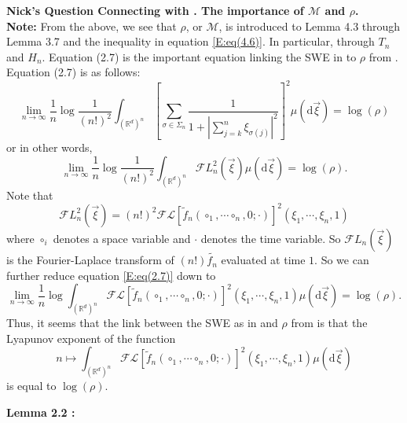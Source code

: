 \documentclass[a4paper,11pt]{article}
\numberwithin{equation}{section}
\theoremstyle{plain}
\theoremstyle{definition}
\newcommand{\ud}{\ensuremath{\mathrm{d} }}
\newcommand{\R}{\mathbb{R}}
\newcounter{NQ}
\newenvironment{NickQuestion}[1][] %
{\refstepcounter{NQ}
	\begin{mdframed}[backgroundcolor=lightgray]\textbf{Nick's Question \theNQ \: #1~~}~~~\noindent}%
	{\end{mdframed}}
\numberwithin{NQ}{section}
\numberwithin{LQ}{section}
\numberwithin{ZQ}{section}
\begin{document}
\begin{NickQuestion}[Connecting \cite{BCC21} with \cite{BCR09}. The importance of $\mathcal{M}$ and $\rho$.]
\textbf{Note:} From the above, we see that $\rho$, or $\mathcal{M}$, is introduced to Lemma 4.3 through Lemma 3.7 and the inequality in equation \eqref{E:eq(4.6)}. In particular, through $T_n$ and $H_n$. Equation (2.7) \cite{BCC21} is the important equation linking the SWE in \cite{BCC21} to $\rho$ from \cite{BCR09}. Equation (2.7) is as follows:
	\begin{equation}\label{E:eq(2.7)}
		\lim_{n \to \infty} \frac{1}{n} \log \frac{1}{(n!)^2} \int_{(\R^d)^n} \left[ \sum_{\sigma \in \Sigma_n} \frac{1}{ 1 + \left| \sum_{j=k}^n \xi_{\sigma(j)} \right|^2 } \right]^2 \mu(\ud \vec{\xi}) = \log(\rho)
	\end{equation}
or in other words,
	\[
		\lim_{n \to \infty} \frac{1}{n} \log \frac{1}{(n!)^2} \int_{(\R^d)^n} \mathcal{F}L_n^2(\vec{\xi}) \mu(\ud \vec{\xi}) = \log(\rho).
	\]
Note that
	\begin{equation}\label{E:FLn}
		\mathcal{F}L_n^2(\vec{\xi})  = (n!)^2 \mathcal{F}\mathcal{L}\left[\tilde{f}_n(\circ_1,\cdots\circ_n,0;\cdot)\right]^2(\xi_1,\cdots,\xi_n,1)
	\end{equation}
where $\circ_i$ denotes a space variable and $\cdot$ denotes the time variable. So $\mathcal{F}L_n(\vec{\xi}) $ is the Fourier-Laplace transform of $(n!)\tilde{f_n}$ evaluated at time $1$. So we can further reduce equation \eqref{E:eq(2.7)} down to
	\begin{equation}\label{E:FL}
		\lim_{n \to \infty} \frac{1}{n} \log  \int_{(\R^d)^n} \mathcal{F}\mathcal{L}\left[\tilde{f}_n(\circ_1,\cdots\circ_n,0;\cdot)\right]^2(\xi_1,\cdots,\xi_n,1) \mu(\ud \vec{\xi}) = \log(\rho).
	\end{equation}
Thus, it seems that the link between the SWE as in \cite{BCC21} and $\rho$ from \cite{BCR09} is that the Lyapunov exponent of the function
	\begin{equation}\label{E:FLfunction}
		n \mapsto \int_{(\R^d)^n} \mathcal{F}\mathcal{L}\left[\tilde{f}_n(\circ_1,\cdots\circ_n,0;\cdot)\right]^2(\xi_1,\cdots,\xi_n,1) \mu(\ud \vec{\xi})
	\end{equation}
is equal to $\log(\rho)$.

\textbf{Lemma 2.2 \cite{BCR09}:}


\end{NickQuestion}
\end{document}
